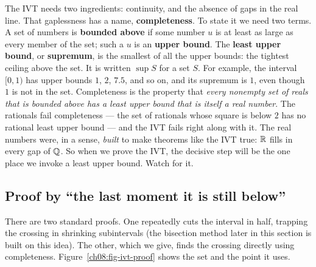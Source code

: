 \begin{happeningbox}
The IVT needs two ingredients: continuity, and the absence of gaps in the real line.
That gaplessness has a name, \textbf{completeness}. To state it we need two terms. A set
of numbers is \textbf{bounded above} if some number $u$ is at least as large as every
member of the set; such a $u$ is an \textbf{upper bound}. The \textbf{least upper bound},
or \textbf{supremum}, is the smallest of all the upper bounds: the tightest ceiling above
the set. It is written $\sup S$ for a set $S$. For example, the interval $[0,1)$ has upper
bounds $1$, $2$, $7.5$, and so on, and its supremum is $1$, even though $1$ is not in the
set. Completeness is the property that \emph{every nonempty set of reals that is bounded
above has a least upper bound that is itself a real number}. The rationals fail completeness --- the set of
rationals whose square is below $2$ has no rational least upper bound --- and the IVT fails
right along with it. The real numbers were, in a sense, \emph{built} to make theorems like
the IVT true: $\mathbb{R}$ fills in every gap of $\mathbb{Q}$. So when we prove the IVT, the
decisive step will be the one place we invoke a least upper bound. Watch for it.
\end{happeningbox}

\subsection{Proof by ``the last moment it is still below''}

There are two standard proofs. One repeatedly cuts the interval in half, trapping the
crossing in shrinking subintervals (the bisection method later in this section is built on
this idea). The other, which we give, finds the
crossing directly using completeness. Figure~\ref{ch08:fig-ivt-proof} shows the set and
the point it uses.

